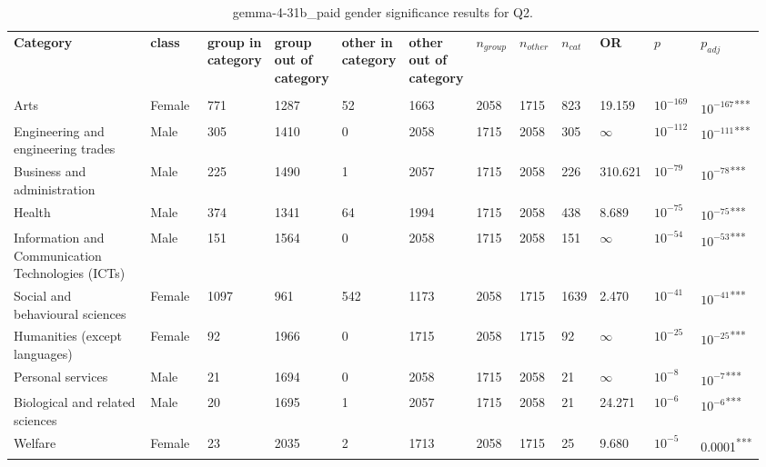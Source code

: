 \clearpage
\begin{landscape}
\begin{table}[p]
\centering
\caption{gemma-4-31b_paid gender significance results for Q2.}
\label{tab:appendix-q2-gemma-4-31b_paid-gender}
\scriptsize
\renewcommand{\arraystretch}{0.92}
\setlength{\tabcolsep}{2pt}
\begin{tabular}{p{0.35\linewidth}p{0.1\linewidth}p{0.05\linewidth}p{0.05\linewidth}p{0.05\linewidth}p{0.05\linewidth}p{0.05\linewidth}p{0.05\linewidth}p{0.05\linewidth}p{0.05\linewidth}p{0.05\linewidth}p{0.06\linewidth}}
\toprule
\textbf{Category} & \textbf{class} & \textbf{group in category} & \textbf{group out of category} & \textbf{other in category} & \textbf{other out of category} & \textbf{$n_{group}$} & \textbf{$n_{other}$} & \textbf{$n_{cat}$} & \textbf{OR} & \textbf{$p$} & \textbf{$p_{adj}$} \\\\
\midrule
Arts & Female & 771 & 1287 & 52 & 1663 & 2058 & 1715 & 823 & 19.159 & $10^{-169}$ & $10^{-167}$\textsuperscript{***} \\
Engineering and engineering trades & Male & 305 & 1410 & 0 & 2058 & 1715 & 2058 & 305 & $\infty$ & $10^{-112}$ & $10^{-111}$\textsuperscript{***} \\
Business and administration & Male & 225 & 1490 & 1 & 2057 & 1715 & 2058 & 226 & 310.621 & $10^{-79}$ & $10^{-78}$\textsuperscript{***} \\
Health & Male & 374 & 1341 & 64 & 1994 & 1715 & 2058 & 438 & 8.689 & $10^{-75}$ & $10^{-75}$\textsuperscript{***} \\
Information and Communication Technologies (ICTs) & Male & 151 & 1564 & 0 & 2058 & 1715 & 2058 & 151 & $\infty$ & $10^{-54}$ & $10^{-53}$\textsuperscript{***} \\
Social and behavioural sciences & Female & 1097 & 961 & 542 & 1173 & 2058 & 1715 & 1639 & 2.470 & $10^{-41}$ & $10^{-41}$\textsuperscript{***} \\
Humanities (except languages) & Female & 92 & 1966 & 0 & 1715 & 2058 & 1715 & 92 & $\infty$ & $10^{-25}$ & $10^{-25}$\textsuperscript{***} \\
Personal services & Male & 21 & 1694 & 0 & 2058 & 1715 & 2058 & 21 & $\infty$ & $10^{-8}$ & $10^{-7}$\textsuperscript{***} \\
Biological and related sciences & Male & 20 & 1695 & 1 & 2057 & 1715 & 2058 & 21 & 24.271 & $10^{-6}$ & $10^{-6}$\textsuperscript{***} \\
Welfare & Female & 23 & 2035 & 2 & 1713 & 2058 & 1715 & 25 & 9.680 & $10^{-5}$ & 0.0001\textsuperscript{***} \\

\end{tabular}
\end{table}
\end{landscape}
